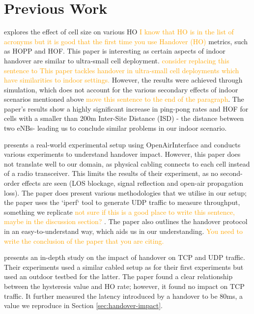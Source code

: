 \section{Previous Work}

\citet{sucasas_simulation_2019} explores the effect of cell size on various HO \textcolor{orange}{I know that HO is in the list of acronyms but it is good that the first time you use Handover (HO)} metrics, such as HOPP and HOF. This paper is interesting as certain aspects of indoor handover are similar to ultra-small cell deployment. \textcolor{orange}{consider replacing this sentence to This paper tackles handover in ultra-small cell deployments which have similarities to indoor settings.} However, the results were achieved through simulation, which does not account for the various secondary effects of indoor scenarios mentioned above \textcolor{orange}{move this sentence to the end of the paragraph}. The paper's results show a highly significant increase in ping-pong rates and HOF for cells with a smaller than 200m Inter-Site Distance (ISD) - the distance between two eNBs- leading us to conclude similar problems in our indoor scenario.

\citet{bertolini_evaluating_2021} presents a real-world experimental setup using OpenAirInterface and conducts various experiments to understand handover impact. However, this paper does not translate well to our domain, as physical cabling connects to each cell instead of a radio transceiver. This limits the results of their experiment, as no second-order effects are seen (LOS blockage, signal reflection and open-air propagation loss). The paper does present various methodologies that we utilise in our setup; the paper uses the `iperf` tool to generate UDP traffic to measure throughput, something we replicate \textcolor{orange}{not sure if this is a good place to write this sentence, maybe in the discussion section? }. The paper also outlines the handover protocol in an easy-to-understand way, which aids us in our understanding. \textcolor{orange}{You need to write the conclusion of the paper that you are citing.}

\citet{zhang_performance_2012} presents an in-depth study on the impact of handover on TCP and UDP traffic. Their experiments used a similar cabled setup as \citep{bertolini_evaluating_2021} for their first experiments but used an outdoor testbed for the latter. The paper found a clear relationship between the hysteresis value and HO rate; however, it found no impact on TCP traffic. It further measured the latency introduced by a handover to be 80ms, a value we reproduce in Section \ref{sec:handover-impact}.

